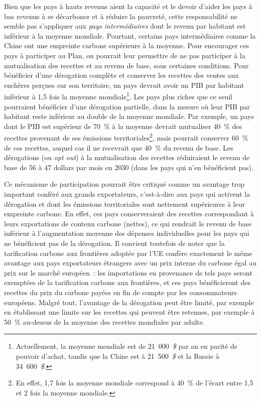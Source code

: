 \documentclass[a5paper,french,openany]{memoir}
\begin{document}
Bien que les pays à hauts revenus aient la capacité et le devoir d'aider les pays à bas revenus à se décarboner et à réduire la pauvreté, cette responsabilité ne semble pas s'appliquer aux \textit{pays intermédiaires} dont le revenu par habitant est inférieur à la moyenne mondiale. Pourtant, certains pays intermédiaires comme la Chine ont une empreinte carbone supérieure à la moyenne. Pour encourager ces pays à participer au Plan, on pourrait leur permettre de ne pas participer à la mutualisation des recettes et au revenu de base, sous certaines conditions. Pour bénéficier d'une dérogation complète et conserver les recettes des ventes aux enchères perçues sur son territoire, un pays devrait avoir un PIB par habitant inférieur à 1,5 fois la moyenne mondiale\footnote{Actuellement, la moyenne mondiale est de 21~000~\textit{\$} par an en parité de pouvoir d'achat, tandis que la Chine est à 21~500~\textit{\$} et la Russie à 34~600~\textit{\$}.}. 
Les pays plus riches que ce seuil pourraient bénéficier d'une dérogation partielle, dans la mesure où leur PIB par habitant reste inférieur au double de la moyenne mondiale. Par exemple, un pays dont le PIB est supérieur de 70~\% à la moyenne devrait mutualiser 40~\% des recettes provenant de ses émissions territoriales\footnote{En effet, 1,7 fois la moyenne mondiale correspond à 40~\% de l'écart entre 1,5 et 2 fois la moyenne mondiale.}, mais pourrait conserver 60~\% de ces recettes, auquel cas il ne recevrait que 40~\% du revenu de base. Les dérogations (ou \textit{opt out}) à la mutualisation des recettes réduiraient le revenu de base de 56 à 47 dollars par mois en 2030 (dans les pays qui n'en bénéficient pas). 

Ce mécanisme de participation pourrait être critiqué comme un avantage trop important conféré aux grands exportateurs, c'est-à-dire aux pays qui activent la dérogation et dont les émissions territoriales sont nettement supérieures à leur empreinte carbone. En effet, ces pays conserveraient des recettes correspondant à leurs exportations de contenu carbone (nettes), ce qui rendrait le revenu de base inférieur à l'augmentation moyenne des dépenses individuelles pour les pays qui ne bénéficient pas de la dérogation. Il convient toutefois de noter que la tarification carbone aux frontières adoptée par l'UE confère exactement le même avantage aux pays exportateurs étrangers avec un prix interne du carbone égal au prix sur le marché européen~: les importations en provenance de tels pays seront exemptées de la tarification carbone aux frontières, et ces pays bénéficieront des recettes du prix du carbone payées en fin de compte par les consommateurs européens. Malgré tout, l'avantage de la dérogation peut être limité, par exemple en établissant une limite sur les recettes qui peuvent être retenues, par exemple à 50~\% au-dessus de la moyenne des recettes mondiales par adulte. %
\end{document}
